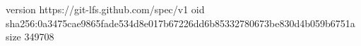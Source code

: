 version https://git-lfs.github.com/spec/v1
oid sha256:0a3475cae9865fade534d8e017b67226dd6b85332780673be830d4b059b6751a
size 349708
